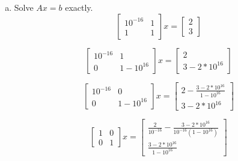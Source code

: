 \documentclass[12pt]{article}
\theoremstyle{homework}
\begin{document}
\begin{enumerate}[(a)]
\item
Solve $Ax=b$ exactly.
$$\begin{bmatrix}
10^{-16} & 1\\
1 & 1
\end{bmatrix}x=\begin{bmatrix}
2\\
3
\end{bmatrix}$$

$$\begin{bmatrix}
10^{-16} & 1\\
0 & 1-10^{16}
\end{bmatrix}x=\begin{bmatrix}
2\\
3-2*10^{16}
\end{bmatrix}$$

$$\begin{bmatrix}
10^{-16} & 0\\
0 & 1-10^{16}
\end{bmatrix}x=\begin{bmatrix}
2-\frac{3-2*10^{16}}{1-10^{16}}\\
3-2*10^{16}
\end{bmatrix}$$

$$\begin{bmatrix}
1 & 0\\
0 & 1
\end{bmatrix}x=\begin{bmatrix}
\frac{2}{10^{-16}}-\frac{3-2*10^{16}}{10^{-16}(1-10^{16})}\\
\frac{3-2*10^{16}}{1-10^{16}}
\end{bmatrix}$$


\end{enumerate}
\end{document}

